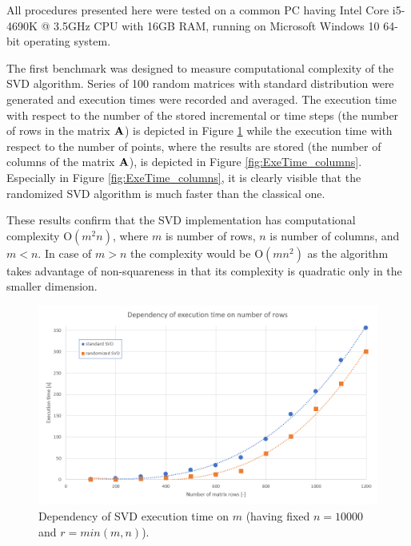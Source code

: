 All procedures presented here were tested on a common PC having Intel Core i5-4690K @ 3.5GHz CPU with 16GB RAM, running on Microsoft Windows 10 64-bit operating system.

The first benchmark was designed to measure computational complexity of the SVD algorithm. Series of 100 random matrices with standard distribution were generated and execution times were recorded and averaged. The execution time with respect to the number of the stored incremental or time steps (the number of rows in the matrix $\mathbf{A}$) is depicted in Figure \ref{fig:ExeTime_rows} while the execution time with respect to the number of points, where the results are stored (the number of columns of the matrix $\mathbf{A}$), is depicted in Figure \ref{fig:ExeTime_columns}. Especially in Figure \ref{fig:ExeTime_columns}, it is clearly visible that the randomized SVD algorithm is much faster than the classical one.

These results confirm that the SVD implementation has computational complexity $\mathrm{O}(m^2n)$, where $m$ is number of rows, $n$ is number of columns, and $m < n$. In case of $m > n$ the complexity would be $\mathrm{O}(mn^2)$ as the algorithm takes advantage of non-squareness in that its complexity is quadratic only in the smaller dimension.

\begin{figure}[H]
\centering
\includegraphics[width=\textwidth]{figures/chapter-SVD/executionTime_varyingRows}
\decoRule
\caption[Dependency of SVD execution time on number of rows.]{Dependency of SVD execution time on $m$ (having fixed $n = 10000$ and $r=min(m,n)$).}
\label{fig:ExeTime_rows}
\end{figure}

